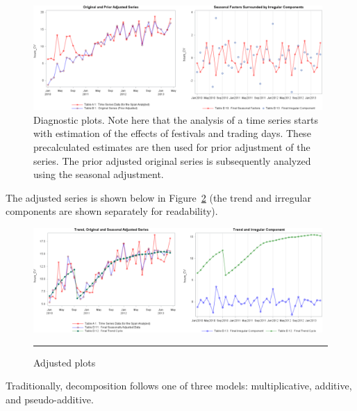\begin{figure}[t]
\centering
\includegraphics[width=0.98\textwidth]{images/TS/DiffComponents.png}
\caption[Diagnostic plots.]{Diagnostic plots. Note here that the analysis of a time series starts with estimation of the effects of festivals and trading days. These precalculated
estimates are then used for prior adjustment of the series. The prior adjusted original series is
subsequently analyzed using the seasonal adjustment.}
\label{fig:diff}
\end{figure}
The adjusted series is shown below in Figure~\ref{fig:adjusted} (the trend and irregular components are shown separately for readability).
\begin{figure}[t]
\centering
\includegraphics[width=0.98\textwidth]{images/TS/adjustedplot.png}
\caption{Adjusted plots}\hrule
\label{fig:adjusted}
\end{figure}
\newl Traditionally, decomposition follows one of three models: multiplicative, additive, and pseudo-additive. 
